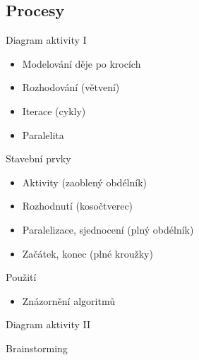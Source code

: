 \subsection{Procesy}



\begin{frame}{Diagram aktivity I}

\begin{itemize}[<+->]
    \item Modelování děje po krocích
    \item Rozhodování (větvení)
    \item Iterace (cykly)
    \item Paralelita
\end{itemize}

\onslide<+->Stavební prvky
\begin{itemize}[<+->]
    \item Aktivity (zaoblený obdélník)
    \item Rozhodnutí (kosočtverec)
    \item Paralelizace, sjednocení (plný obdélník)
    \item Začátek, konec (plné kroužky)
\end{itemize}

\onslide<+->Použití
\begin{itemize}[<+->]
    \item Znázornění algoritmů
\end{itemize}

\end{frame}



\begin{frame}{Diagram aktivity II}

Brainstorming

\begin{figure}
\end{figure}

\end{frame}


